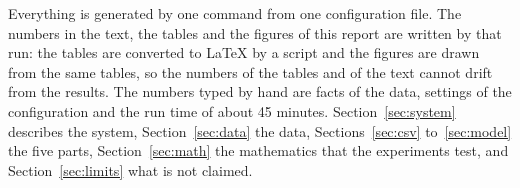 Everything is generated by one command from one configuration file. The numbers in the text, the tables and the figures of this report are written by that run: the tables are converted to \LaTeX{} by a script and the figures are drawn from the same tables, so the numbers of the tables and of the text cannot drift from the results. The numbers typed by hand are facts of the data, settings of the configuration and the run time of about 45 minutes. Section~\ref{sec:system} describes the system, Section~\ref{sec:data} the data, Sections~\ref{sec:csv} to~\ref{sec:model} the five parts, Section~\ref{sec:math} the mathematics that the experiments test, and Section~\ref{sec:limits} what is not claimed.
